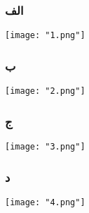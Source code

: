 \subsubsection*{الف}

\texttt{[image: "1.png"]}

\subsubsection*{ب}
\texttt{[image: "2.png"]}

\pagebreak
\subsubsection*{ج}
\texttt{[image: "3.png"]}

\subsubsection*{د}
\texttt{[image: "4.png"]}
